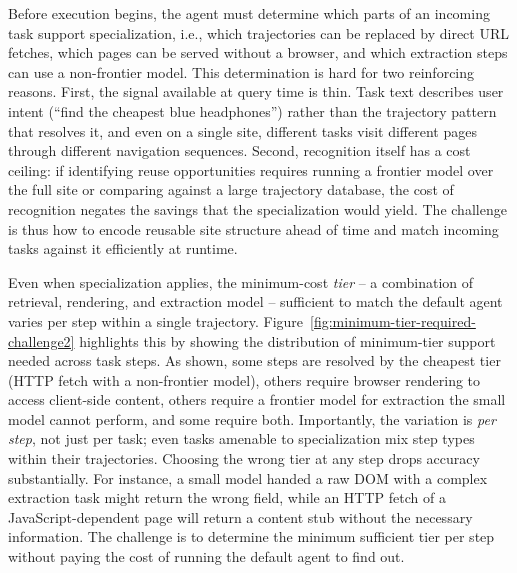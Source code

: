 Before execution begins, the agent must determine which parts of an incoming task support specialization, i.e., which trajectories can be replaced by direct URL fetches, which pages can be served without a browser, and which extraction steps can use a non-frontier model. This determination is hard for two reinforcing reasons. First, the signal available at query time is thin. Task text describes user intent (``find the cheapest blue headphones'') rather than the trajectory pattern that resolves it, and even on a single site, different tasks visit different pages through different navigation sequences. Second, recognition itself has a cost ceiling: if identifying reuse opportunities requires running a frontier model over the full site or comparing against a large trajectory database, the cost of recognition negates the savings that the specialization would yield. The challenge is thus how to encode reusable site structure ahead of time and match incoming tasks against it efficiently at runtime.



Even when specialization applies, the minimum-cost \emph{tier} -- a combination of retrieval, rendering, and extraction model -- sufficient to match the default agent varies per step within a single trajectory. Figure~\ref{fig:minimum-tier-required-challenge2} highlights this by showing the distribution of minimum-tier support needed across task steps. As shown, some steps are resolved by the cheapest tier (HTTP fetch with a non-frontier model), others require browser rendering to access client-side content, others require a frontier model for extraction the small model cannot perform, and some require both. Importantly, the variation is \emph{per step}, not just per task; even tasks amenable to specialization mix step types within their trajectories. Choosing the wrong tier at any step drops accuracy substantially. For instance, a small model handed a raw DOM with a complex extraction task might return the wrong field, while an HTTP fetch of a JavaScript-dependent page will return a content stub without the necessary information. The challenge is to determine the minimum sufficient tier per step without paying the cost of running the default agent to find out.


